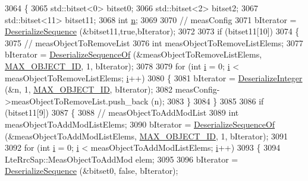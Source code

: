 \begin{DoxyCode}
3064 \{
3065   std::bitset<0> bitset0;
3066   std::bitset<2> bitset2;
3067   std::bitset<11> bitset11;
3068   \textcolor{keywordtype}{int} \hyperlink{namespacesample-rng-plot_aeb5ee5c431e338ef39b7ac5431242e1d}{n};
3069 
3070   \textcolor{comment}{// measConfig}
3071   bIterator = \hyperlink{classns3_1_1Asn1Header_a58c68bb97ba3fe2e8fcdd7c208d672b2}{DeserializeSequence} (&bitset11,\textcolor{keyword}{true},bIterator);
3072 
3073   \textcolor{keywordflow}{if} (bitset11[10])
3074     \{
3075       \textcolor{comment}{// measObjectToRemoveList}
3076       \textcolor{keywordtype}{int} measObjectToRemoveListElems;
3077       bIterator = \hyperlink{classns3_1_1Asn1Header_a1a7245e05b482df8abade0a060bd0ecc}{DeserializeSequenceOf} (&measObjectToRemoveListElems, 
      \hyperlink{lte-rrc-header_8cc_ab2de695aee029784062779621283535d}{MAX\_OBJECT\_ID}, 1, bIterator);
3078 
3079       \textcolor{keywordflow}{for} (\textcolor{keywordtype}{int} \hyperlink{bernuolliDistribution_8m_a6f6ccfcf58b31cb6412107d9d5281426}{i} = 0; \hyperlink{bernuolliDistribution_8m_a6f6ccfcf58b31cb6412107d9d5281426}{i} < measObjectToRemoveListElems; \hyperlink{bernuolliDistribution_8m_a6f6ccfcf58b31cb6412107d9d5281426}{i}++)
3080         \{
3081           bIterator = \hyperlink{classns3_1_1Asn1Header_a49802c9af30018b078150e866b6ecae2}{DeserializeInteger} (&n, 1, \hyperlink{lte-rrc-header_8cc_ab2de695aee029784062779621283535d}{MAX\_OBJECT\_ID}, bIterator);
3082           measConfig->measObjectToRemoveList.push\_back (n);
3083         \}
3084     \}
3085 
3086   \textcolor{keywordflow}{if} (bitset11[9])
3087     \{
3088       \textcolor{comment}{// measObjectToAddModList}
3089       \textcolor{keywordtype}{int} measObjectToAddModListElems;
3090       bIterator = \hyperlink{classns3_1_1Asn1Header_a1a7245e05b482df8abade0a060bd0ecc}{DeserializeSequenceOf} (&measObjectToAddModListElems, 
      \hyperlink{lte-rrc-header_8cc_ab2de695aee029784062779621283535d}{MAX\_OBJECT\_ID}, 1, bIterator);
3091 
3092       \textcolor{keywordflow}{for} (\textcolor{keywordtype}{int} \hyperlink{bernuolliDistribution_8m_a6f6ccfcf58b31cb6412107d9d5281426}{i} = 0; \hyperlink{bernuolliDistribution_8m_a6f6ccfcf58b31cb6412107d9d5281426}{i} < measObjectToAddModListElems; \hyperlink{bernuolliDistribution_8m_a6f6ccfcf58b31cb6412107d9d5281426}{i}++)
3093         \{
3094           LteRrcSap::MeasObjectToAddMod elem;
3095 
3096           bIterator = \hyperlink{classns3_1_1Asn1Header_a58c68bb97ba3fe2e8fcdd7c208d672b2}{DeserializeSequence} (&bitset0, \textcolor{keyword}{false}, bIterator);

\end{DoxyCode}
